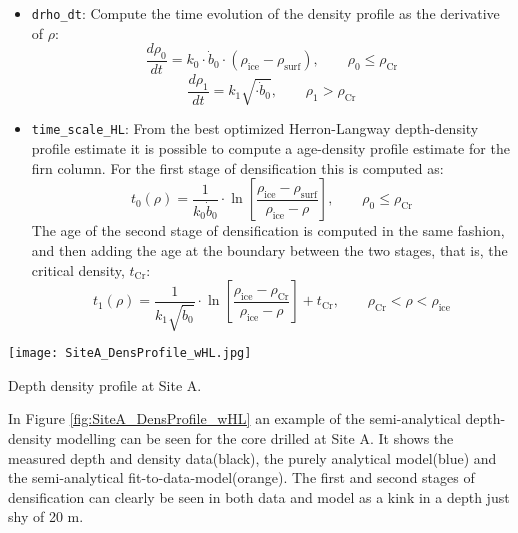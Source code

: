 \documentclass[../../CompleteThesis/Complete_1stDraft.tex]{subfiles}
\begin{document}
\begin{itemize}
		\item \lstinline[columns=fixed]|drho_dt|: Compute the time evolution of the density profile as the derivative of $\rho$:
		\begin{equation}
			\frac{d\rho_0}{dt} = k_0 \cdot\dot{b}_0\cdot (\rho_{\text{ice}} - \rho_{\text{surf}}), \qquad \rho_0 \leq \rho_{\text{Cr}}
		\end{equation}
		\begin{equation}
			\frac{d\rho_1}{dt} = k_1 \sqrt{\cdot\dot{b}_0}, \qquad \rho_1 > \rho_{\text{Cr}}
		\end{equation}	
		\item \lstinline[columns=fixed]|time_scale_HL|: From the best optimized Herron-Langway depth-density profile estimate it is possible to compute a age-density profile estimate for the firn column. For the first stage of densification this is computed as:
		\begin{equation}
			t_0(\rho) = \frac{1}{k_0 \dot{b}_0} \cdot \ln\left[\frac{\rho_{\text{ice}} - \rho_{\text{surf}}}{\rho_{\text{ice}} - \rho}\right], \qquad \rho_0 \leq \rho_{\text{Cr}}
		\end{equation}
		The age of the second stage of densification is computed in the same fashion, and then adding the age at the boundary between the two stages, that is, the critical density, $t_{\text{Cr}}$:
		\begin{equation}
			t_1(\rho) = \frac{1}{k_1 \sqrt{\dot{b}_0}}\cdot\ln\left[\frac{\rho_{\text{ice}} - \rho_{\text{Cr}}}{\rho_{\text{ice}} - \rho}\right] + t_{\text{Cr}}, \qquad \rho_{\text{Cr}} < \rho < \rho_{\text{ice}}
		\end{equation}
	\end{itemize}
	
	\begin{marginfigure}
		\centering
		\texttt{[image: SiteA\_DensProfile\_wHL.jpg]}
		\caption[Herron Langway density profile Site A]{\footnotesize{Depth density profile at Site A.}}%
		\label{fig:SiteA_DensProfile_wHL}
	\end{marginfigure}
	In Figure \ref{fig:SiteA_DensProfile_wHL} an example of the semi-analytical depth-density modelling can be seen for the core drilled at Site A. It shows the measured depth and density data(black), the purely analytical model(blue) and the semi-analytical fit-to-data-model(orange). The first and second stages of densification can clearly be seen in both data and model as a kink in a depth just shy of 20 m.
	
\end{document}
